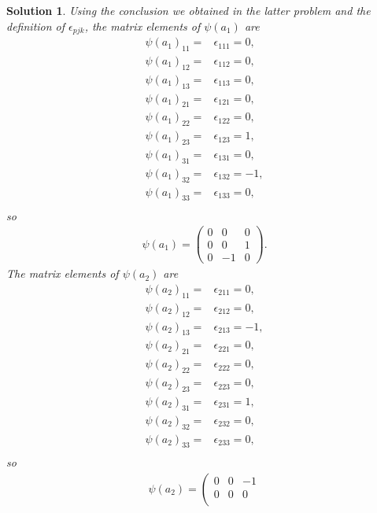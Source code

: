 \documentclass[UTF8,10pt,a4paper]{article}
\theoremstyle{Problem}
\theoremstyle{Solution}
\newtheorem*{sol}{Solution}
\begin{document}
\begin{sol}
    Using the conclusion we obtained in the latter problem and the definition of $\epsilon_{pjk}$, the matrix elements of $\psi(a_1)$ are
    \begin{align}
        \psi(a_1)_{11}=&\epsilon_{111}=0,\\
        \psi(a_1)_{12}=&\epsilon_{112}=0,\\
        \psi(a_1)_{13}=&\epsilon_{113}=0,\\
        \psi(a_1)_{21}=&\epsilon_{121}=0,\\
        \psi(a_1)_{22}=&\epsilon_{122}=0,\\
        \psi(a_1)_{23}=&\epsilon_{123}=1,\\
        \psi(a_1)_{31}=&\epsilon_{131}=0,\\
        \psi(a_1)_{32}=&\epsilon_{132}=-1,\\
        \psi(a_1)_{33}=&\epsilon_{133}=0,\\
    \end{align}
    so
    \begin{align}
        \psi(a_1)=\left(\begin{matrix}
            0&0&0\\
            0&0&1\\
            0&-1&0
        \end{matrix}\right).
    \end{align}
    The matrix elements of $\psi(a_2)$ are
    \begin{align}
        \psi(a_2)_{11}=&\epsilon_{211}=0,\\
        \psi(a_2)_{12}=&\epsilon_{212}=0,\\
        \psi(a_2)_{13}=&\epsilon_{213}=-1,\\
        \psi(a_2)_{21}=&\epsilon_{221}=0,\\
        \psi(a_2)_{22}=&\epsilon_{222}=0,\\
        \psi(a_2)_{23}=&\epsilon_{223}=0,\\
        \psi(a_2)_{31}=&\epsilon_{231}=1,\\
        \psi(a_2)_{32}=&\epsilon_{232}=0,\\
        \psi(a_2)_{33}=&\epsilon_{233}=0,\\
    \end{align}
    so
    \begin{align}
        \psi(a_2)=\left(\begin{matrix}
            0&0&-1\\
            0&0&0\\

\end{matrix}
\end{align}
\end{sol}
\end{document}
